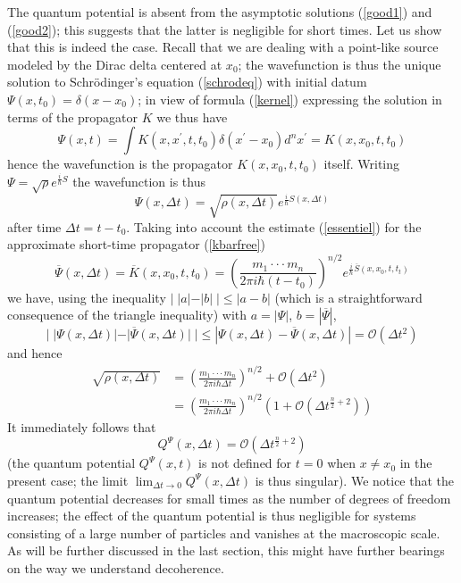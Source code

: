 \documentclass[12pt]{article}%
\begin{document}
The quantum potential is absent from the asymptotic solutions (\ref{good1})
and (\ref{good2}); this suggests that the latter is negligible for short
times. Let us show that this is indeed the case. Recall that we are dealing
with a point-like source modeled by the Dirac delta centered at $x_{0}$; the
wavefunction is thus the unique solution to Schr\"{o}dinger's equation
(\ref{schrodeq}) with initial datum $\Psi(x,t_{0})=\delta(x-x_{0})$; in view
of formula (\ref{kernel}) expressing the solution in terms of the propagator
$K$ we thus have
\[
\Psi(x,t)=\int K(x,x^{\prime},t,t_{0})\delta(x^{\prime}-x_{0})d^{n}x^{\prime
}=K(x,x_{0},t,t_{0})
\]
hence the wavefunction is the propagator $K(x,x_{0},t,t_{0})$ itself. Writing
$\Psi=\sqrt{\rho}e^{\frac{i}{\hbar}S}$ the wavefunction is thus
\[
\Psi(x,\Delta t)=\sqrt{\rho(x,\Delta t)}e^{\frac{i}{\hbar}S(x,\Delta t)}%
\]
after time $\Delta t=t-t_{0}$. Taking into account the estimate
(\ref{essentiel}) for the approximate short-time propagator (\ref{kbarfree})%
\[
\overline{\Psi}(x,\Delta t)=\overline{K}(x,x_{0},t,t_{0})=\left(  \frac
{m_{1}\cdot\cdot\cdot m_{n}}{2\pi i\hbar(t-t_{0})}\right)  ^{n/2}e^{\frac
{i}{\hbar}\overline{S}(x,x_{0},t,t_{t})}%
\]
we have, using the inequality $|\;|a|-|b|\;|\leq|a-b|$ (which is a
straightforward consequence of the triangle inequality) with $a=|\Psi|$,
$b=|\overline{\Psi}|$,
\[
|\;|\Psi(x,\Delta t)|-|\overline{\Psi}(x,\Delta t)|\;|\leq|\Psi(x,\Delta
t)-\overline{\Psi}(x,\Delta t)|=\mathcal{O}(\Delta t^{2})
\]
and hence%
\begin{align*}
\sqrt{\rho(x,\Delta t)}  &  =\left(  \frac{m_{1}\cdot\cdot\cdot m_{n}}{2\pi
i\hbar\Delta t}\right)  ^{n/2}+\mathcal{O}(\Delta t^{2})\\
&  =\left(  \frac{m_{1}\cdot\cdot\cdot m_{n}}{2\pi i\hbar\Delta t}\right)
^{n/2}(1+\mathcal{O}(\Delta t^{\frac{n}{2}+2}))
\end{align*}
It immediately follows that%
\[
Q^{\Psi}(x,\Delta t)=\mathcal{O}(\Delta t^{\frac{n}{2}+2})
\]
(the quantum potential $Q^{\Psi}(x,t)$ is not defined for $t=0$ when $x\neq
x_{0}$ in the present case; the limit $\lim_{\Delta t\rightarrow0}Q^{\Psi
}(x,\Delta t)$ is thus singular). We notice that the quantum potential
decreases for small times as the number of degrees of freedom increases; the
effect of the quantum potential is thus negligible for systems consisting of a
large number of particles and vanishes at the macroscopic scale. As will be
further discussed in the last section, this might have further bearings on the
way we understand decoherence.
\end{document}

